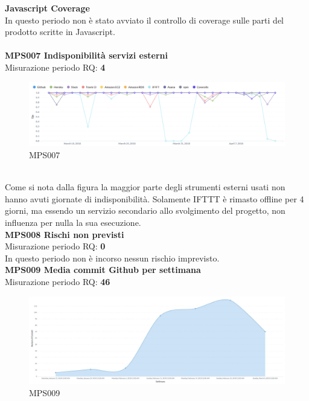 \documentclass[PianoDiQualifica.tex]{subfiles}
\begin{document}
\newpage
\textbf{Javascript Coverage}\\
In questo periodo non è stato avviato il controllo di coverage sulle parti del prodotto scritte in Javascript.\\\\

\textbf{MPS007 Indisponibilità servizi esterni}\\
Misurazione periodo RQ: \textbf{4}
\begin{figure}[htb]
	\centering
	\includegraphics[width=1\linewidth]{RQ/MPS007}
	\caption{MPS007}
	\label{fig:processi}
\end{figure}
\\Come si nota dalla figura la maggior parte degli strumenti esterni usati non hanno avuti giornate di indisponibilità.
Solamente IFTTT è rimasto offline per 4 giorni, ma essendo un servizio secondario allo svolgimento del progetto, non influenza per nulla la sua esecuzione. \\

\textbf{MPS008 Rischi non previsti}\\
Misurazione periodo RQ: \textbf{0}\\
In questo periodo non è incorso nessun rischio imprevisto.\\

\textbf{MPS009 Media commit Github per settimana}\\
Misurazione periodo RQ: \textbf{46}
\begin{figure}[htb]
	\centering
	\includegraphics[width=1\linewidth]{RP/MPS009}
	\caption{MPS009}
	\label{fig:processi}
\end{figure}
\\
\end{document}
